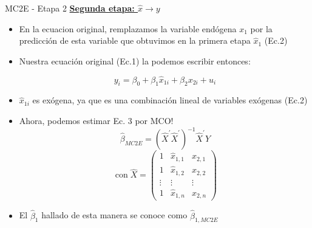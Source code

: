 \documentclass[10pt]{beamer}
\begin{document}
\begin{frame}{MC2E - Etapa 2}
    \underline{\textbf{Segunda etapa: $\hat{x} \rightarrow y$}}

    \begin{itemize}
        \item En la ecuacion original, remplazamos la variable endógena $x_{1}$ por la predicción de esta variable que obtuvimos en la primera etapa $\hat{x}_{1}$ (Ec.2)
        \item Nuestra ecuación original (Ec.1) la podemos escribir entonces:
        
        \begin{equation*}
        y_{i}=\beta_{0}+\beta_{1} \hat{x}_{1 i}+\beta_{2} x_{2 i}+u_{i} \tag{3}
        \end{equation*}
        
        \item $\hat{x}_{1 i}$ es exógena, ya que es una combinación lineal de variables exógenas (Ec.2)
        \item Ahora, podemos estimar Ec. 3 por MCO!
        $$
        \hat{\beta}_{M C 2 E}=\left(\hat{X}^{\prime} \hat{X}^{\prime}\right)^{-1} \hat{X}^{\prime} Y
        $$
        $$
        \operatorname{con} \hat{X}=\left(\begin{array}{ccc}
        1 & \hat{x}_{1,1} & x_{2,1} \\
        1 & \hat{x}_{1,2} & x_{2,2} \\
        \vdots & \vdots & \vdots \\
        1 & \hat{x}_{1, n} & x_{2, n}
        \end{array}\right)
        $$
        \item El $\hat{\beta}_{1}$ hallado de esta manera se conoce como $\hat{\beta}_{1, M C 2 E}$
    \end{itemize}
\end{frame}
\end{document}
